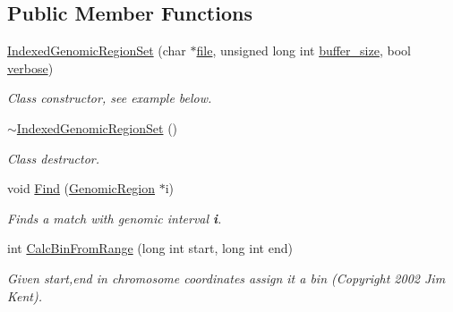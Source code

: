 \subsection*{Public Member Functions}
\begin{CompactItemize}
\item 
\hypertarget{classIndexedGenomicRegionSet_f4e3d07d6b9c1dfbc795c636edbcb939}{
\hyperlink{classIndexedGenomicRegionSet_f4e3d07d6b9c1dfbc795c636edbcb939}{IndexedGenomicRegionSet} (char $\ast$\hyperlink{classGenomicRegionSet_7c593d1beab775590d5b810097644583}{file}, unsigned long int \hyperlink{classGenomicRegionSet_4d60b5403d2d6aaeda541ed45625b245}{buffer\_\-size}, bool \hyperlink{classGenomicRegionSet_2646e9e6d5da1693b4bea36a5acc082e}{verbose})}
\label{classIndexedGenomicRegionSet_f4e3d07d6b9c1dfbc795c636edbcb939}

\begin{CompactList}\small\item\em Class constructor, see example below. \item\end{CompactList}\item 
\hypertarget{classIndexedGenomicRegionSet_9b29696100e6af8b184d13d135ecf37b}{
\hyperlink{classIndexedGenomicRegionSet_9b29696100e6af8b184d13d135ecf37b}{$\sim$IndexedGenomicRegionSet} ()}
\label{classIndexedGenomicRegionSet_9b29696100e6af8b184d13d135ecf37b}

\begin{CompactList}\small\item\em Class destructor. \item\end{CompactList}\item 
\hypertarget{classIndexedGenomicRegionSet_d05963371eebfcbd246d736290951888}{
void \hyperlink{classIndexedGenomicRegionSet_d05963371eebfcbd246d736290951888}{Find} (\hyperlink{classGenomicRegion}{GenomicRegion} $\ast$i)}
\label{classIndexedGenomicRegionSet_d05963371eebfcbd246d736290951888}

\begin{CompactList}\small\item\em Finds a match with genomic interval {\bf i}. \item\end{CompactList}\item 
\hypertarget{classIndexedGenomicRegionSet_e302fefddacaa1b77e69e0f1657a88d7}{
int \hyperlink{classIndexedGenomicRegionSet_e302fefddacaa1b77e69e0f1657a88d7}{CalcBinFromRange} (long int start, long int end)}
\label{classIndexedGenomicRegionSet_e302fefddacaa1b77e69e0f1657a88d7}

\begin{CompactList}\small\item\em Given start,end in chromosome coordinates assign it a bin (Copyright 2002 Jim Kent). \item\end{CompactList}\end{CompactItemize}
